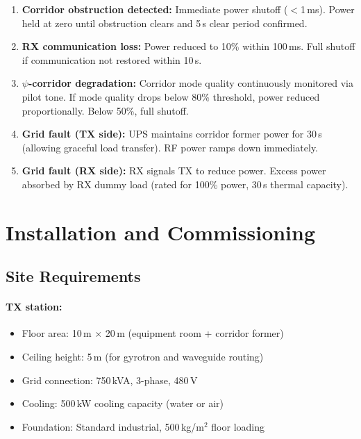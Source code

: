 \documentclass[11pt,a4paper]{article}
\begin{document}
\begin{enumerate}
\item \textbf{Corridor obstruction detected:} Immediate power shutoff
($<$1\,ms). Power held at zero until obstruction clears and 5\,s
clear period confirmed.

\item \textbf{RX communication loss:} Power reduced to 10\% within 100\,ms.
Full shutoff if communication not restored within 10\,s.

\item \textbf{$\psi$-corridor degradation:} Corridor mode quality continuously
monitored via pilot tone. If mode quality drops below 80\% threshold,
power reduced proportionally. Below 50\%, full shutoff.

\item \textbf{Grid fault (TX side):} UPS maintains corridor former power
for 30\,s (allowing graceful load transfer). RF power ramps down
immediately.

\item \textbf{Grid fault (RX side):} RX signals TX to reduce power.
Excess power absorbed by RX dummy load (rated for 100\% power,
30\,s thermal capacity).
\end{enumerate}

\section{Installation and Commissioning}

\subsection{Site Requirements}

\paragraph{TX station:}
\begin{itemize}
\item Floor area: 10\,m $\times$ 20\,m (equipment room + corridor former)
\item Ceiling height: 5\,m (for gyrotron and waveguide routing)
\item Grid connection: 750\,kVA, 3-phase, 480\,V
\item Cooling: 500\,kW cooling capacity (water or air)
\item Foundation: Standard industrial, 500\,kg/m$^2$ floor loading
\end{itemize}
\end{document}
